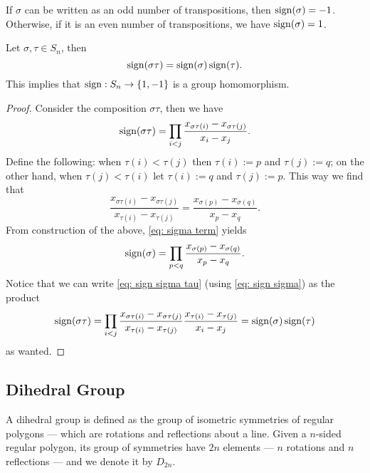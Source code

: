 \begin{corollary}
If \(\sigma\) can be written as an odd number of transpositions, then
\(\operatorname{sign}(\sigma) = -1\). Otherwise, if it is an even number of
transpositions, we have \(\operatorname{sign}(\sigma) = 1\).
\end{corollary}

\begin{proposition}\label{prop: sign is a group homomorphism}
Let \(\sigma, \tau \in S_n\), then
\[
  \operatorname{sign}(\sigma \tau) = \operatorname{sign}(\sigma)
  \operatorname{sign}(\tau).
\]
This implies that \(\operatorname{sign}: S_n \to \{1, -1\}\) is a
group homomorphism.
\end{proposition}

\begin{proof}
Consider the composition \(\sigma \tau\), then we have
\begin{equation}\label{eq: sign sigma tau}
    \operatorname{sign}(\sigma \tau) = \prod_{i < j} \frac{x_{\sigma\tau(i)} -
    x_{\sigma\tau(j)}}{x_i - x_j}.
\end{equation}
Define the following: when \(\tau(i) < \tau(j)\) then \(\tau(i) := p\) and
\(\tau(j) := q\); on the other hand, when \(\tau(j) < \tau(i)\) let \(\tau(i)
:= q\) and \(\tau(j) := p\). This way we find that
\begin{equation}\label{eq: sigma term}
  \frac{x_{\sigma\tau(i)} - x_{\sigma\tau(j)}}{x_{\tau(i)} - x_{\tau(j)}}
  = \frac{x_{\sigma(p)} - x_{\sigma(q)}}{x_p - x_q}.
\end{equation}
From construction of the above, \cref{eq: sigma term} yields
\begin{equation}\label{eq: sign sigma}
  \operatorname{sign}(\sigma) = \prod_{p < q} \frac{x_{\sigma(p)} -
  x_{\sigma(q)}}{x_p - x_q}.
\end{equation}
Notice that we can write \cref{eq: sign sigma tau} (using \cref{eq: sign
sigma}) as the product
\[
  \operatorname{sign}(\sigma \tau) = \prod_{i < j}
  \frac{x_{\sigma \tau(i)} - x_{\sigma \tau(j)}}{x_{\tau(i)} - x_{\tau(j)}}
  \frac{x_{\tau(i)} - x_{\tau(j)}}{x_i - x_j}
  = \operatorname{sign}(\sigma) \operatorname{sign}(\tau)
\]
as wanted.
\end{proof}

\subsection{Dihedral Group}

\begin{definition}\label{def: dihedral}
A dihedral group is defined as the group of isometric symmetries of regular
polygons --- which are rotations and reflections about a line. Given a
\(n\)-sided regular polygon, its group of symmetries have \(2n\) elements ---
\(n\) rotations and \(n\) reflections --- and we denote it by \(D_{2n}\).
\end{definition}

